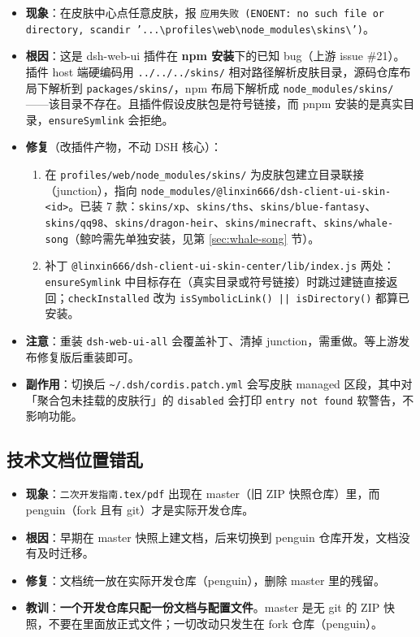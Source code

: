 \documentclass[11pt]{ctexart}
\newcommand{\code}[1]{\texttt{\small #1}}
\begin{document}
\begin{itemize}[itemsep=2pt]
  \item \textbf{现象}：在皮肤中心点任意皮肤，报 \code{应用失败 (ENOENT: no such file or directory, scandir '...\textbackslash profiles\textbackslash web\textbackslash node\_modules\textbackslash skins\textbackslash')}。
  \item \textbf{根因}：这是 dsh-web-ui 插件在 \textbf{npm 安装}下的已知 bug（上游 issue \#21）。插件 host 端硬编码用 \code{../../../skins/} 相对路径解析皮肤目录，源码仓库布局下解析到 \code{packages/skins/}，npm 布局下解析成 \code{node\_modules/skins/}——该目录不存在。且插件假设皮肤包是符号链接，而 pnpm 安装的是真实目录，\code{ensureSymlink} 会拒绝。
  \item \textbf{修复}（改插件产物，不动 DSH 核心）：
    \begin{enumerate}[itemsep=1pt]
      \item 在 \code{profiles/web/node\_modules/skins/} 为皮肤包建立目录联接（junction），指向 \code{node\_modules/@linxin666/dsh-client-ui-skin-<id>}。已装 7 款：\code{skins/xp}、\code{skins/ths}、\code{skins/blue-fantasy}、\code{skins/qq98}、\code{skins/dragon-heir}、\code{skins/minecraft}、\code{skins/whale-song}（鲸吟需先单独安装，见第 \ref{sec:whale-song} 节）。
      \item 补丁 \code{@linxin666/dsh-client-ui-skin-center/lib/index.js} 两处：\code{ensureSymlink} 中目标存在（真实目录或符号链接）时跳过建链直接返回；\code{checkInstalled} 改为 \code{isSymbolicLink() || isDirectory()} 都算已安装。
    \end{enumerate}
  \item \textbf{注意}：重装 \code{dsh-web-ui-all} 会覆盖补丁、清掉 junction，需重做。等上游发布修复版后重装即可。
  \item \textbf{副作用}：切换后 \code{\textasciitilde/.dsh/cordis.patch.yml} 会写皮肤 managed 区段，其中对「聚合包未挂载的皮肤行」的 \code{disabled} 会打印 \code{entry not found} 软警告，不影响功能。
\end{itemize}

\subsection{技术文档位置错乱}
\label{sec:doc-location}

\begin{itemize}[itemsep=2pt]
  \item \textbf{现象}：\code{二次开发指南.tex/pdf} 出现在 master（旧 ZIP 快照仓库）里，而 penguin（fork 且有 git）才是实际开发仓库。
  \item \textbf{根因}：早期在 master 快照上建文档，后来切换到 penguin 仓库开发，文档没有及时迁移。
  \item \textbf{修复}：文档统一放在实际开发仓库（penguin），删除 master 里的残留。
  \item \textbf{教训}：\textbf{一个开发仓库只配一份文档与配置文件}。master 是无 git 的 ZIP 快照，不要在里面放正式文件；一切改动只发生在 fork 仓库（penguin）。
\end{itemize}
\end{document}
